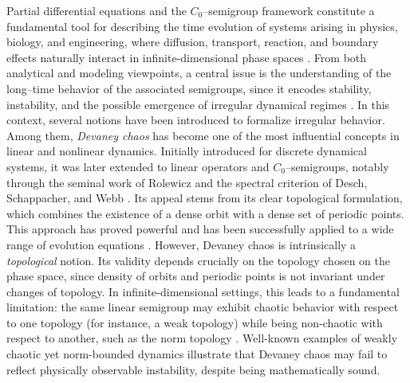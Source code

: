 \documentclass[12pt]{article}
\begin{document}
Partial differential equations and the $C_0$--semigroup framework constitute a fundamental tool for describing the time evolution of systems arising in physics, biology, and engineering, where diffusion, transport, reaction, and boundary effects naturally interact in infinite-dimensional phase spaces \cite{Pazy1983,EngelNagel2000,Evans2010}.  From both analytical and modeling viewpoints, a central issue is the understanding of the long--time behavior of the associated semigroups, since it encodes stability, instability, and the possible emergence of irregular dynamical regimes \cite{Arendt2011}. In this context, several notions have been introduced to formalize irregular behavior. Among them, \emph{Devaney chaos} has become one of the most influential concepts in linear and nonlinear dynamics. Initially introduced for discrete dynamical systems, it was later extended to linear operators and $C_0$--semigroups, notably through the seminal work of Rolewicz and the spectral criterion of Desch, Schappacher, and Webb \cite{Rolewicz1969,DeschSchappacherWebb1997}. Its appeal stems from its clear topological formulation, which combines the existence of a dense orbit with a dense set of periodic points. This approach has proved powerful and has been successfully applied to a wide range of evolution equations \cite{Conejero2017}. However, Devaney chaos is intrinsically a \emph{topological} notion. Its validity depends crucially on the topology chosen on the phase space, since density of orbits and periodic points is not invariant under changes of topology. In infinite-dimensional settings, this leads to a fundamental limitation: the same linear semigroup may exhibit chaotic behavior with respect to one topology (for instance, a weak topology) while being non-chaotic with respect to another, such as the norm topology \cite{BayartMatheron2009,GrosseErdmannPeris2011}. 
Well-known examples of weakly chaotic yet norm-bounded dynamics illustrate that Devaney chaos may fail to reflect physically observable instability, despite being mathematically sound.
\end{document}
